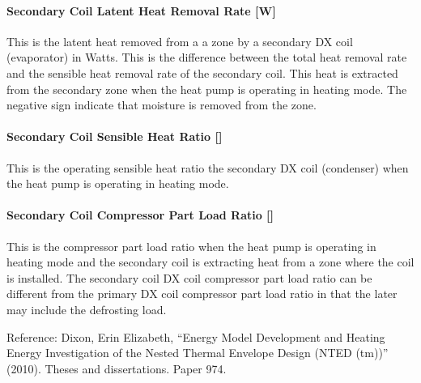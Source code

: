 \paragraph{Secondary Coil Latent Heat Removal Rate {[}W{]}}\label{secondary-coil-latent-heat-removal-rate-w}

This is the latent heat removed from a a zone by a secondary DX coil (evaporator) in Watts. This is the difference between the total heat removal rate and the sensible heat removal rate of the secondary coil. This heat is extracted from the secondary zone when the heat pump is operating in heating mode. The negative sign indicate that moisture is removed from the zone.

\paragraph{Secondary Coil Sensible Heat Ratio {[]}}\label{secondary-coil-sensible-heat-ratio}

This is the operating sensible heat ratio the secondary DX coil (condenser) when the heat pump is operating in heating mode.

\paragraph{Secondary Coil Compressor Part Load Ratio {[]}}\label{secondary-coil-compressor-part-load-ratio}

This is the compressor part load ratio when the heat pump is operating in heating mode and the secondary coil is extracting heat from a zone where the coil is installed. The secondary coil DX coil compressor part load ratio can be different from the primary DX coil compressor part load ratio in that the later may include the defrosting load.

Reference: Dixon, Erin Elizabeth, ``Energy Model Development and Heating Energy Investigation of the Nested Thermal Envelope Design (NTED (tm))'' (2010). Theses and dissertations. Paper 974.
